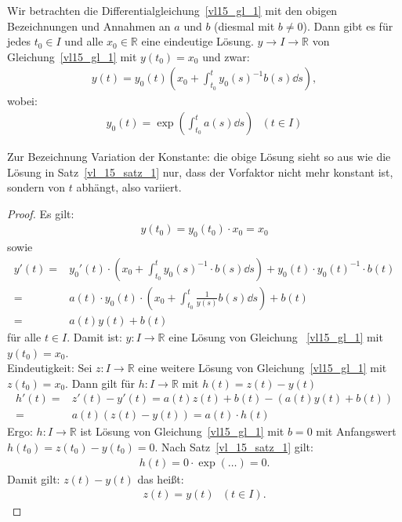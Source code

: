 \begin{Satz}{
	Wir betrachten die Differentialgleichung~\ref{vl15_gl_1} mit den obigen 
	Bezeichnungen und Annahmen an $a$ und $b$ (diesmal mit $b \neq 0$). 
	Dann gibt es für jedes $t_0 \in I$ und alle $x_0 \in \mathbb{R}$ eine eindeutige 
	Lösung. $y \rightarrow I \rightarrow \mathbb{R}$ von Gleichung~\ref{vl15_gl_1} 
	mit $y(t_0) = x_0$ und zwar:
	\begin{align*}
		y(t) = y_0(t) \left( x_0 + \int_{t_0}^t y_0(s)^{-1} b(s) \dd{s}\right),
	\end{align*}
	wobei: 
	\begin{align*}
		y_0(t) = \exp\left(\int_{t_0}^t a(s) \dd{s}\right) \text{ }(t \in I)
	\end{align*}		
}\end{Satz}

\begin{Bemerkung}{
	Zur Bezeichnung \glqq Variation der Konstante\grqq{}: die obige Lösung sieht so 
	aus wie die Lösung in Satz~\ref{vl_15_satz_1}
	nur, dass der Vorfaktor nicht mehr konstant ist, sondern von $t$ abhängt, also 
	\glqq variiert\grqq{}.
}\end{Bemerkung}

\begin{proof}
	Es gilt: 
	\begin{align*}
		y(t_0) = y_0 (t_0) \cdot x_0 = x_0
	\end{align*}
	sowie
	\begin{align*}
		y'(t) = & y_0'(t) \cdot \left( x_0 + \int_{t_0}^t y_0(s)^{-1} \cdot b(s) 
		\dd{s} \right)+ y_0(t) \cdot y_0(t)^{-1} \cdot b(t) \\
		= & a(t) \cdot  y_0(t) \cdot\left( 
			x_0 + \int_{t_0}^t  \frac{1}{y(s)} b(s) \dd{s} 
			\right) + b(t) \\
		= & a(t) y(t) + b(t)
	\end{align*}
	für alle $t \in I$.
	Damit ist: $y: I \rightarrow \mathbb{R}$ eine Lösung von Gleichung~
	\ref{vl15_gl_1} mit $y(t_0) = x_0$.\\
	Eindeutigkeit: Sei $z : I \rightarrow \mathbb{R}$ eine weitere Lösung von 
	Gleichung~\ref{vl15_gl_1} mit $z(t_0) = x_0$. 
	Dann gilt für $h: I \rightarrow \mathbb{R}$ mit $h(t) = z(t) - y(t)$
	\begin{align*}
		h'(t) = & z'(t) - y'(t) = a(t) z(t) + b(t) - \left(a(t)y(t) + b(t)\right) \\
		= & a(t) (z(t) - y(t)) = a(t) \cdot h(t)
	\end{align*}
	Ergo: $h: I \rightarrow \mathbb{R}$ ist Lösung von Gleichung~\ref{vl15_gl_1} mit 
	$b = 0$ mit Anfangswert $h(t_0) = z(t_0) -y(t_0) = 0$.
	Nach Satz~\ref{vl_15_satz_1} gilt:
	\begin{align*}
		h(t) = 0 \cdot  \exp(\hdots) = 0.
	\end{align*}		
	Damit gilt: $z(t) -y(t)$ das heißt:
	\begin{align*}
		z(t) = y(t)\text{ }(t \in I).
	\end{align*}
\end{proof}

